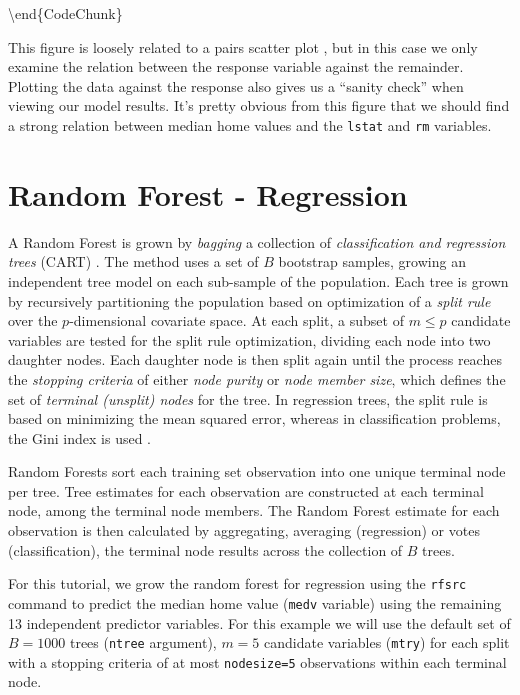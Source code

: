 \documentclass[article]{jss}
\begin{document}
\textbackslash{}end\{CodeChunk\}

This figure is loosely related to a pairs scatter plot
\citep{Becker:1988}, but in this case we only examine the relation
between the response variable against the remainder. Plotting the data
against the response also gives us a ``sanity check'' when viewing our
model results. It's pretty obvious from this figure that we should find
a strong relation between median home values and the \texttt{lstat} and
\texttt{rm} variables.

\hypertarget{random-forest---regression}{%
\section{Random Forest - Regression}\label{random-forest---regression}}

A Random Forest is grown by \emph{bagging} \citep{Breiman:1996} a
collection of \emph{classification and regression trees} (CART)
\citep{cart:1984}. The method uses a set of \(B\) bootstrap
\citep{bootstrap:1994} samples, growing an independent tree model on
each sub-sample of the population. Each tree is grown by recursively
partitioning the population based on optimization of a \emph{split rule}
over the \(p\)-dimensional covariate space. At each split, a subset of
\(m \le p\) candidate variables are tested for the split rule
optimization, dividing each node into two daughter nodes. Each daughter
node is then split again until the process reaches the \emph{stopping
criteria} of either \emph{node purity} or \emph{node member size}, which
defines the set of \emph{terminal (unsplit) nodes} for the tree. In
regression trees, the split rule is based on minimizing the mean squared
error, whereas in classification problems, the Gini index is used
\citep{Friedman:2000}.

Random Forests sort each training set observation into one unique
terminal node per tree. Tree estimates for each observation are
constructed at each terminal node, among the terminal node members. The
Random Forest estimate for each observation is then calculated by
aggregating, averaging (regression) or votes (classification), the
terminal node results across the collection of \(B\) trees.

For this tutorial, we grow the random forest for regression using the
\texttt{rfsrc} command to predict the median home value (\texttt{medv}
variable) using the remaining 13 independent predictor variables. For
this example we will use the default set of \(B=1000\) trees
(\texttt{ntree} argument), \(m=5\) candidate variables (\texttt{mtry})
for each split with a stopping criteria of at most \texttt{nodesize=5}
observations within each terminal node.
\end{document}
